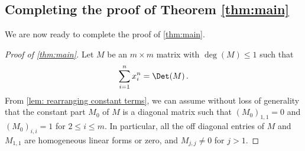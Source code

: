 \subsection{Completing the proof of Theorem \ref{thm:main}}\label{sec:completing the proof}
We are now ready to complete the proof of \autoref{thm:main}. 
\begin{proof}[Proof of \autoref{thm:main}]
Let $M$ be an $m \times m$ matrix with $\deg(M) \leq 1$ such that 
\[
\sum_{i = 1}^n x_i^n = \Det(M) \, .
\]
From \autoref{lem: rearranging constant terms}, we can assume without loss of generality that the constant part $M_0$ of $M$ is a diagonal matrix such that $(M_0)_{1,1} = 0$ and $(M_0)_{i,i}=1$ for $2 \le i \le m$. In particular, all the off diagonal entries of $M$ and $M_{1,1}$ are homogeneous linear forms or zero, and $M_{j, j} \neq 0$ for $j > 1$. 


\end{proof}
